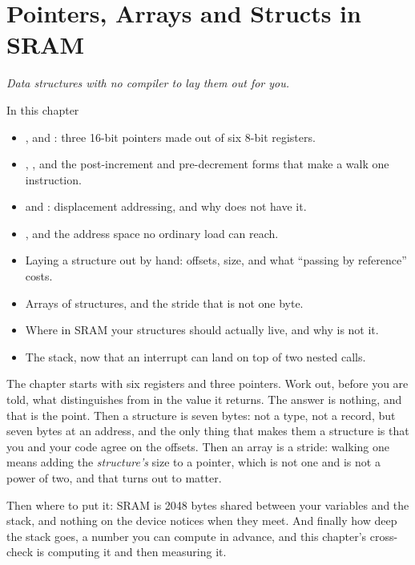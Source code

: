 
\chapter{Pointers, Arrays and Structs in SRAM}
\label{c4:ch:pointers}

{\large\itshape Data structures with no compiler to lay them out for you.\par}

\begin{chapterbox}{In this chapter}
\begin{itemize}
  \item {},  and : three 16-bit pointers made out of six 8-bit registers.
  \item {}, , and the post-increment and pre-decrement forms that make a walk one
    instruction.
  \item {} and : displacement addressing, and why  does not have it.
  \item {}, and the address space no ordinary load can reach.
  \item Laying a structure out by hand: offsets, size, and what ``passing by reference'' costs.
  \item Arrays of structures, and the stride that is not one byte.
  \item Where in SRAM your structures should actually live, and why  is not it.
  \item The stack, now that an interrupt can land on top of two nested calls.
\end{itemize}
\end{chapterbox}

The chapter starts with six registers and three pointers. Work out, before you are told, what
distinguishes  from  in the value it returns. The answer is
nothing, and that is the point. Then a structure is seven bytes: not a type, not a record, but
seven bytes at an address, and the only thing that makes them a structure is that you and your code
agree on the offsets. Then an array is a stride: walking one means adding the \emph{structure's}
size to a pointer, which is not one and is not a power of two, and that turns out to matter.

Then where to put it: SRAM is 2048 bytes shared between your variables and the stack, and nothing
on the device notices when they meet. And finally how deep the stack goes, a number you can
compute in advance, and this chapter's cross-check is computing it and then measuring it.

